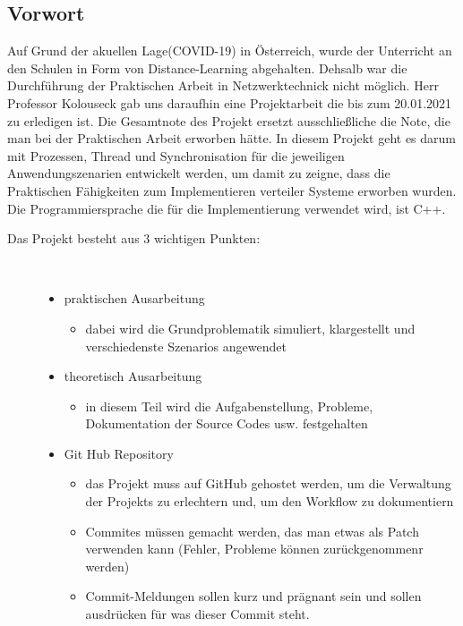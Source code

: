 \documentclass[a4paper,12pt]{exam}
\begin{document}
\subsection{Vorwort}

Auf Grund der akuellen Lage(COVID-19) in Österreich, wurde der Unterricht an den Schulen
in Form von Distance-Learning abgehalten. Dehsalb war die Durchführung der Praktischen Arbeit in
Netzwerktechnick nicht möglich. Herr Professor Kolouseck gab uns daraufhin eine Projektarbeit die bis zum 
20.01.2021 zu erledigen ist. Die Gesamtnote des Projekt ersetzt ausschließliche die Note,
die man bei der Praktischen Arbeit erworben hätte. In diesem Projekt geht es darum mit Prozessen, Thread und Synchronisation
für die jeweiligen Anwendungszenarien entwickelt werden, um damit zu zeigne, dass die Praktischen
Fähigkeiten zum Implementieren verteiler Systeme erworben wurden. Die Programmiersprache die für
die Implementierung verwendet wird, ist C++.

\begin{description}
    \item[Das Projekt besteht aus 3 wichtigen Punkten:] ~\par
    \begin{itemize}
        \item praktischen Ausarbeitung
        \begin{itemize}
            \item  dabei wird die Grundproblematik simuliert, klargestellt und verschiedenste Szenarios angewendet 
        \end{itemize}
        \item theoretisch Ausarbeitung
        \begin{itemize}
            \item  in diesem Teil wird die Aufgabenstellung, Probleme, Dokumentation der Source Codes usw. festgehalten 
        \end{itemize}
        \item Git Hub Repository
        \begin{itemize}
            \item das Projekt muss auf GitHub gehostet werden, um die Verwaltung der Projekts zu erlechtern und, um den Workflow zu dokumentiern 
            \item Commites müssen gemacht werden, das man etwas als Patch verwenden kann (Fehler, Probleme können zurückgenommenr werden)
            \item Commit-Meldungen sollen kurz und prägnant sein und sollen ausdrücken für was dieser Commit steht.
        \end{itemize}
    \end{itemize} 
\end{description}
\end{document}

